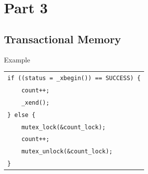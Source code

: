 \documentclass[xcolor=dvipsnames]{beamer}
\begin{document}

\section{Part 3}
\subsection{Transactional Memory}
\newcommand\xbegin{\texttt{\_xbegin()}\xspace}
\newcommand\xend{\texttt{\_xend()}\xspace}
\newcommand\xabort{\texttt{\_xabort()}\xspace}


\begin{frame}{Example}
	\begin{center}
		\begin{tabular}{l}
			\texttt{if ((status = \_xbegin()) == SUCCESS) \{} \\ %
			\texttt{~~~~count++;} \\
			\texttt{~~~~\_xend();} \\
			\texttt{\} else \{}\\ %
			\texttt{~~~~mutex\_lock(\&count\_lock);} \\
			\texttt{~~~~count++;} \\
			\texttt{~~~~mutex\_unlock(\&count\_lock);} \\
			\texttt{\}} \\
		\end{tabular}
	\end{center}
\end{frame}
\end{document}
